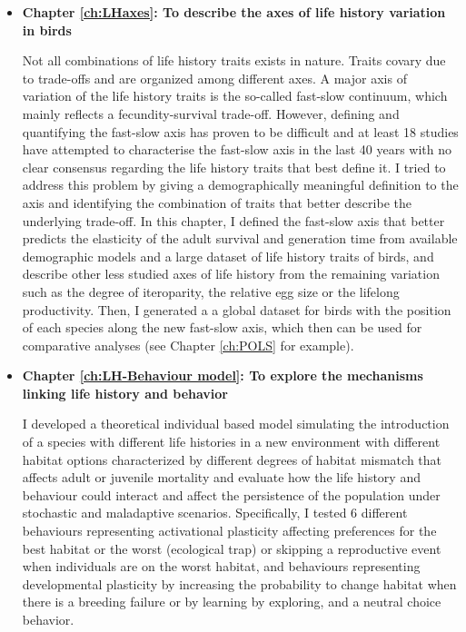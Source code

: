 \begin{itemize}
\item \textbf{Chapter \ref{ch:LHaxes}: To describe the axes of life history 
variation in birds}

Not all combinations of life history traits exists in nature. Traits covary
due to trade-offs and are organized among different axes. A major axis
of variation of the life history traits is the so-called fast-slow continuum,
which mainly reflects a fecundity-survival trade-off. However, defining and
quantifying the fast-slow axis has proven to be difficult and at least 18
studies have attempted to characterise the fast-slow axis in the last 40 years
with no clear consensus regarding the life history traits that best define it.
I tried to address this problem by giving a demographically meaningful
definition to the axis and identifying the combination of traits that better
describe the underlying trade-off.
In this chapter, I defined the fast-slow axis that better predicts the 
elasticity of the adult survival and generation time from available demographic 
models and a large dataset of life history traits of birds, and describe other
less studied axes of life history from the remaining variation such as the
degree of iteroparity, the relative egg size or the lifelong productivity. Then,
I generated a a global dataset for birds with the position of each species along
the new fast-slow axis, which then can be used for comparative analyses (see
Chapter \ref{ch:POLS} for example).
\bigskip


\item \textbf{Chapter \ref{ch:LH-Behaviour model}: To explore the mechanisms 
linking life history and behavior}

I developed a theoretical individual based model simulating the introduction of
a species with different life histories in a new environment with different
habitat options characterized by different degrees of habitat mismatch that
affects adult or juvenile mortality and evaluate how the life history and
behaviour could interact and affect the persistence of the population under
stochastic and maladaptive scenarios. Specifically, I tested 6 different
behaviours representing activational plasticity affecting preferences for the
best habitat or the worst (ecological trap) or skipping a reproductive event
when individuals are on the worst habitat, and behaviours representing
developmental plasticity by increasing the probability to change habitat
when there is a breeding failure or by learning by exploring, and a neutral
choice behavior.
\bigskip



\end{itemize}
